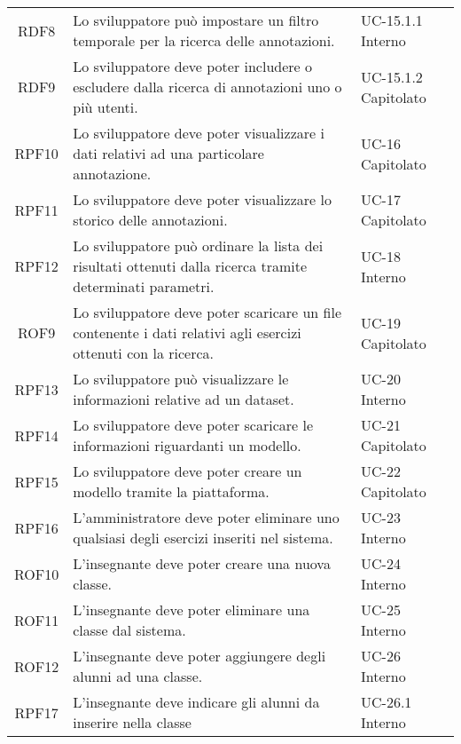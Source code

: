 \begin{tabularx}{\textwidth}{| c | p{10cm} | X |}
		RDF8 & Lo sviluppatore può impostare un filtro temporale per la ricerca delle annotazioni. & UC-15.1.1 \newline Interno\\
		RDF9 &  Lo sviluppatore deve poter includere o escludere dalla ricerca di annotazioni uno o più utenti. & UC-15.1.2 \newline Capitolato\\
		RPF10 & Lo sviluppatore deve poter visualizzare i dati relativi ad una particolare annotazione. & UC-16 \newline Capitolato\\
		RPF11 & Lo sviluppatore deve poter visualizzare lo storico delle annotazioni. & UC-17 \newline Capitolato\\
		RPF12 & Lo sviluppatore può ordinare la lista dei risultati ottenuti dalla ricerca tramite determinati parametri. & UC-18 \newline Interno\\	
		ROF9 & Lo sviluppatore deve poter scaricare un file contenente i dati relativi agli esercizi ottenuti con la ricerca. & UC-19 \newline Capitolato\\
		RPF13 & Lo sviluppatore può visualizzare le informazioni relative ad un dataset. & UC-20 \newline Interno\\
		RPF14 & Lo sviluppatore deve poter scaricare le informazioni riguardanti un modello. & UC-21 \newline Capitolato\\
		RPF15 & Lo sviluppatore deve poter creare un modello tramite la piattaforma. & UC-22 \newline Capitolato\\ 
		RPF16 & L'amministratore deve poter eliminare uno qualsiasi degli esercizi inseriti nel sistema. & UC-23 \newline Interno\\
		ROF10 & L'insegnante deve poter creare una nuova classe. & UC-24 \newline Interno\\
		ROF11 & L'insegnante deve poter eliminare una classe dal sistema. & UC-25 \newline Interno\\
		ROF12 & L'insegnante deve poter aggiungere degli alunni ad una classe. & UC-26 \newline Interno\\
		RPF17 & L'insegnante deve indicare gli alunni da inserire nella classe & UC-26.1 \newline Interno\\

\end{tabularx}

